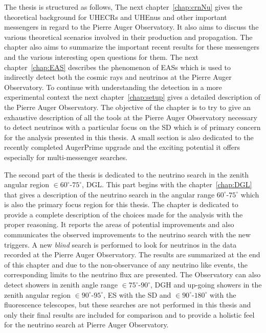 The thesis is structured as follows, The next chapter~\ref{chap:crnNu} gives the theoretical background for \glspl{UHECR} and \glspl{UHEnu} and other important messengers in regard to the Pierre Auger Observatory. It also aims to discuss the various theoretical scenarios involved in their production and propagation. The chapter also aims to summarize the important recent results for these messengers and the various interesting open questions for them. The next chapter~\ref{chap:EAS} describes the phenomenon of \glspl{EAS} which is used to indirectly detect both the cosmic rays and neutrinos at the Pierre Auger Observatory. To continue with understanding the detection in a more experimental context the next chapter~\ref{chap:setup} gives a detailed description of the Pierre Auger Observatory. The objective of the chapter is to try to give an exhaustive description of all the tools at the Pierre Auger Observatory necessary to detect neutrinos with a particular focus on the \gls{SD} which is of primary concern for the analysis presented in this thesis. A small section is also dedicated to the recently completed AugerPrime upgrade and the exciting potential it offers especially for multi-messenger searches. 

The second part of the thesis is dedicated to the neutrino search in the zenith angular region $ \in 60^\circ$-$75^\circ$, \gls{DGL}. This part begins with the chapter~\ref{chap:DGL} that gives a description of the neutrino search in the angular range $60^\circ$-$75^\circ$ which is also the primary focus region for this thesis. The chapter is dedicated to provide a complete description of the choices made for the analysis with the proper reasoning. It reports the areas of potential improvements and also communicates the observed improvements to the neutrino search with the new triggers. A new \textit{blind} search is performed to look for neutrinos in the data recorded at the Pierre Auger Observatory. The results are summarized at the end of this chapter and due to the non-observance of any neutrino like events, the corresponding limits to the neutrino flux are presented. The Observatory can also detect showers in zenith angle range $\in 75^\circ$-$90^\circ$, \gls{DGH} and up-going showers in the zenith angular region $ \in 90^\circ$-$95^\circ$, \gls{ES} with the \gls{SD} and $\in 90^\circ$-$180^\circ$ with the fluorescence telescopes, but these searches are not performed in this thesis and only their final results are included for comparison and to provide a holistic feel for the neutrino search at Pierre Auger Observatory.

